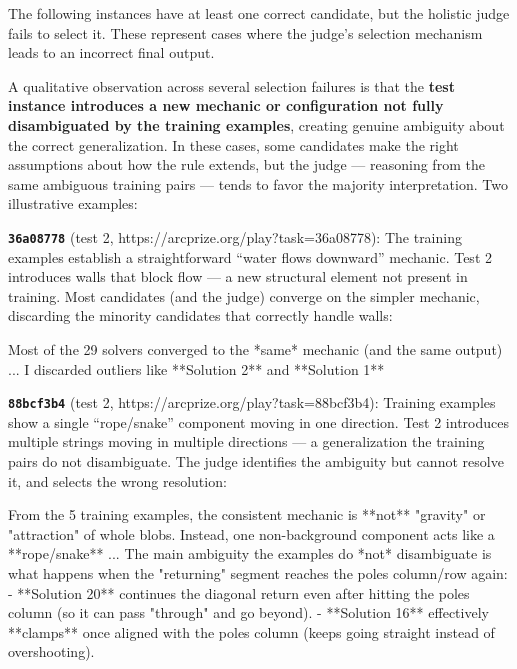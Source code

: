 \documentclass[11pt]{article}
\newenvironment{Shaded}{}{}
\newcommand{\NormalTok}[1]{#1}
\renewenvironment{Shaded}{\begin{snugshade}}{\end{snugshade}}
\begin{document}
The following instances have at least one correct candidate, but the
holistic judge fails to select it. These represent cases where the
judge's selection mechanism leads to an incorrect final output.

A qualitative observation across several selection failures is that the
\textbf{test instance introduces a new mechanic or configuration not
fully disambiguated by the training examples}, creating genuine
ambiguity about the correct generalization. In these cases, some
candidates make the right assumptions about how the rule extends, but
the judge --- reasoning from the same ambiguous training pairs --- tends
to favor the majority interpretation. Two illustrative examples:

\textbf{\texttt{36a08778}} (test 2,
https://arcprize.org/play?task=36a08778): The training examples
establish a straightforward ``water flows downward'' mechanic. Test 2
introduces walls that block flow --- a new structural element not
present in training. Most candidates (and the judge) converge on the
simpler mechanic, discarding the minority candidates that correctly
handle walls:

\begin{Shaded}
\begin{Highlighting}[]
\NormalTok{Most of the 29 solvers converged to the *same* mechanic (and the same output)}
\NormalTok{...}
\NormalTok{I discarded outliers like **Solution 2** and **Solution 1**}
\end{Highlighting}
\end{Shaded}

\textbf{\texttt{88bcf3b4}} (test 2,
https://arcprize.org/play?task=88bcf3b4): Training examples show a
single ``rope/snake'' component moving in one direction. Test 2
introduces multiple strings moving in multiple directions --- a
generalization the training pairs do not disambiguate. The judge
identifies the ambiguity but cannot resolve it, and selects the wrong
resolution:

\begin{Shaded}
\begin{Highlighting}[]
\NormalTok{From the 5 training examples, the consistent mechanic is **not** "gravity" or}
\NormalTok{"attraction" of whole blobs. Instead, one non{-}background component acts like a}
\NormalTok{**rope/snake**}
\NormalTok{...}
\NormalTok{The main ambiguity the examples do *not* disambiguate is what happens when the}
\NormalTok{"returning" segment reaches the pole\textquotesingle{}s column/row again:}
\NormalTok{{-} **Solution 20** continues the diagonal return even after hitting the pole\textquotesingle{}s}
\NormalTok{  column (so it can pass "through" and go beyond).}
\NormalTok{{-} **Solution 16** effectively **clamps** once aligned with the pole\textquotesingle{}s column}
\NormalTok{  (keeps going straight instead of overshooting).}
\end{Highlighting}
\end{Shaded}
\end{document}
